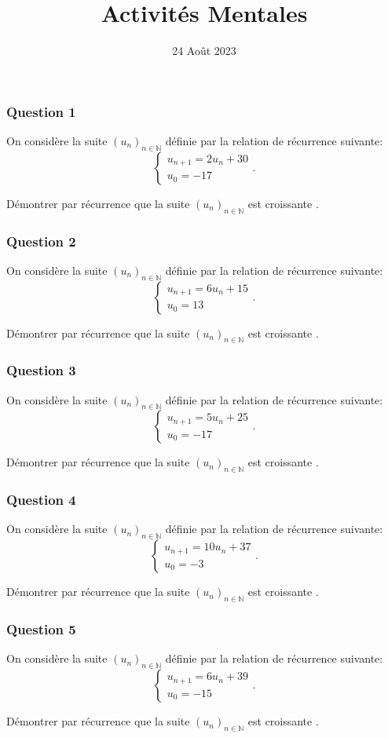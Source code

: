 \documentclass[15pt, mathserif]{beamer}
\title{Activités Mentales}
\date{24 Août 2023}
\begin{document}
\begin{frame}
    \titlepage
\end{frame}

\begin{frame} 
	\frametitle{Question 1}
On considère la suite $(u_n)_{n\in\mathbb{N}}$ définie par la relation de récurrence suivante:\[\begin{cases} u_{n+1} = 2u_n+30\\ u_0 = -17\end{cases}.\]

Démontrer par récurrence que la suite $(u_n)_{n\in\mathbb{N}}$ est  croissante .\end{frame}


\begin{frame} 
	\frametitle{Question 2}
On considère la suite $(u_n)_{n\in\mathbb{N}}$ définie par la relation de récurrence suivante:\[\begin{cases} u_{n+1} = 6u_n+15\\ u_0 = 13\end{cases}.\]

Démontrer par récurrence que la suite $(u_n)_{n\in\mathbb{N}}$ est  croissante .\end{frame}


\begin{frame} 
	\frametitle{Question 3}
On considère la suite $(u_n)_{n\in\mathbb{N}}$ définie par la relation de récurrence suivante:\[\begin{cases} u_{n+1} = 5u_n+25\\ u_0 = -17\end{cases}.\]

Démontrer par récurrence que la suite $(u_n)_{n\in\mathbb{N}}$ est  croissante .\end{frame}


\begin{frame} 
	\frametitle{Question 4}
On considère la suite $(u_n)_{n\in\mathbb{N}}$ définie par la relation de récurrence suivante:\[\begin{cases} u_{n+1} = 10u_n+37\\ u_0 = -3\end{cases}.\]

Démontrer par récurrence que la suite $(u_n)_{n\in\mathbb{N}}$ est  croissante .\end{frame}


\begin{frame} 
	\frametitle{Question 5}
On considère la suite $(u_n)_{n\in\mathbb{N}}$ définie par la relation de récurrence suivante:\[\begin{cases} u_{n+1} = 6u_n+39\\ u_0 = -15\end{cases}.\]

Démontrer par récurrence que la suite $(u_n)_{n\in\mathbb{N}}$ est  croissante .\end{frame}
\end{document}
